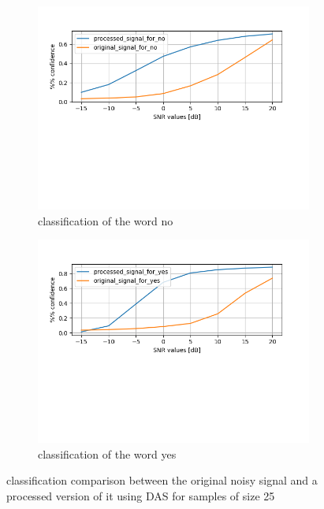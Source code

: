 \documentclass[11pt,a4paper,titlepage]{report}
\begin{document}
\begin{figure}[h!]
	\centering
	\begin{subfigure}{.5\textwidth}
		\centering
		\includegraphics[width=0.9\linewidth]{rapport_beamforming_no.png}
		\caption{classification of the word no}
		\label{fig:sub4}
	\end{subfigure}%
	\begin{subfigure}{.5\textwidth}
		\centering
		\includegraphics[width=0.9\linewidth]{rapport_beamforming_yes.png}
		\caption{classification of the word yes}
		\label{fig:sub6}
	\end{subfigure}
	
	\caption{classification comparison between the original noisy signal and a processed version of it using DAS for samples of size 25}
	\label{fig:rapport15}
\end{figure}\\
\end{document}
